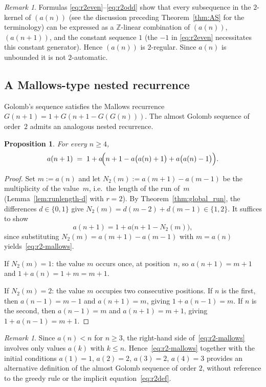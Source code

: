 \documentclass[12pt]{article}
\newtheorem{proposition}[theorem]{Proposition}
\theoremstyle{definition}
\theoremstyle{remark}
\newtheorem{remark}[theorem]{Remark}
\begin{document}
\begin{remark}
  Formulas \eqref{eq:r2even}--\eqref{eq:r2odd} show that every subsequence in the
  $2$-kernel of $(a(n))$ (see the discussion preceding Theorem~\ref{thm:AS} for the terminology)
  can be expressed as a $\mathbb{Z}$-linear combination of
  $(a(n))$, $(a(n+1))$, and the constant sequence $1$ (the $-1$ in \eqref{eq:r2even}
  necessitates this constant generator). Hence $(a(n))$ is $2$-regular.
  Since $a(n)$ is unbounded it is not $2$-automatic.
\end{remark}

\subsection{A Mallows-type nested recurrence}

Golomb's sequence satisfies the Mallows recurrence
$G(n+1)=1+G(n+1-G(G(n)))$. The almost Golomb sequence of order~$2$
admits an analogous nested recurrence.

\begin{proposition}\label{prop:mallows-r2}
For every $n\ge 4$,
\begin{equation}\label{eq:r2-mallows}
a(n+1)
\;=\;
1+a\!\Bigl(n+1-a\bigl(a(n)+1\bigr)+a\bigl(a(n)-1\bigr)\Bigr).
\end{equation}
\end{proposition}

\begin{proof}
Set $m:=a(n)$ and let $N_2(m):=a(m+1)-a(m-1)$ be the multiplicity of
the value~$m$, i.e.\ the length of the run of~$m$
(Lemma~\ref{lem:runlength-d} with $r=2$).
By Theorem~\ref{thm:global_run}, the differences $d\in\{0,1\}$ give
$N_2(m)=d(m-2)+d(m-1)\in\{1,2\}$.
It suffices to show
\begin{equation}\label{eq:r2-mallows-aux}
a(n+1)=1+a\bigl(n+1-N_2(m)\bigr),
\end{equation}
since substituting $N_2(m)=a(m+1)-a(m-1)$ with $m=a(n)$
yields~\eqref{eq:r2-mallows}.

If $N_2(m)=1$: the value $m$ occurs once, at position~$n$,
so $a(n+1)=m+1$ and $1+a(n)=1+m=m+1$.

If $N_2(m)=2$: the value $m$ occupies two consecutive positions.
If $n$ is the first, then $a(n-1)=m-1$ and $a(n+1)=m$,
giving $1+a(n-1)=m$.
If $n$ is the second, then $a(n-1)=m$ and $a(n+1)=m+1$,
giving $1+a(n-1)=m+1$.
\end{proof}

\begin{remark}
Since $a(n)<n$ for $n\ge 3$, the right-hand side of~\eqref{eq:r2-mallows}
involves only values $a(k)$ with $k\le n$.
Hence~\eqref{eq:r2-mallows} together with the initial conditions
$a(1)=1$, $a(2)=2$, $a(3)=2$, $a(4)=3$ provides an alternative
definition of the almost Golomb sequence of order $2$,
without reference to the greedy rule or the implicit
equation~\eqref{eq:r2def}.
\end{remark}
\end{document}
